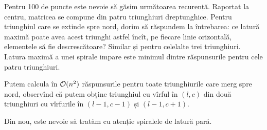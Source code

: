 \documentclass[../main.tex]{subfiles}
\begin{document}
Pentru 100 de puncte este nevoie să găsim următoarea recurență. Raportat la centru, matricea se compune din patru triunghiuri dreptunghice. Pentru triunghiul care se extinde spre nord, dorim să răspundem la întrebarea: ce latură maximă poate avea acest triunghi astfel încît, pe fiecare linie orizontală, elementele să fie descrescătoare? Similar și pentru celelalte trei triunghiuri. Latura maximă a unei spirale impare este minimul dintre răspunsurile pentru cele patru triunghiuri.

Putem calcula în $\mathcal{O}(n^2)$ răspunsurile pentru toate triunghiurile care merg spre nord, observînd că putem obține triunghiul cu vîrful în $(l, c)$ din două triunghiuri cu vîrfurile în $(l - 1, c - 1)$ și $(l - 1, c + 1)$.

Din nou, este nevoie să tratăm cu atenție spiralele de latură pară.
\end{document}
